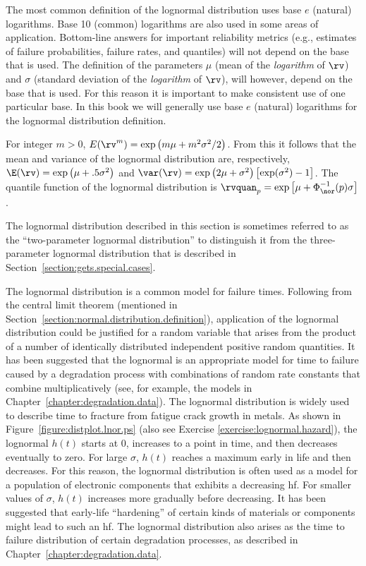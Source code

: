 The most common definition of the lognormal distribution uses base $e$
(natural) logarithms. Base 10 (common) logarithms are also used in
some areas of application. Bottom-line answers for important
reliability metrics (e.g., estimates of failure probabilities, failure
rates, and quantiles) will not depend on the base that is used.  The
definition of the parameters $\mu$ (mean of the {\em logarithm} of
$\rv$) and $\sigma$ (standard deviation of the {\em logarithm} of
$\rv$), will however, depend on the base that is used. For this reason
it is important to make consistent use of one particular base. In this
book we will generally use base $e$ (natural) logarithms for the
lognormal distribution definition.

For integer $m > 0$, $E(\rv^{m})=\exp \left (m \mu + m^{2}
\sigma^{2}/2 \right )$.  From this it follows that the mean and
variance of the lognormal distribution are, respectively, $\E(\rv)=
\exp \left (\mu+.5 \sigma^{2} \right )$ and $\var(\rv)= \exp \left
(2\mu + \sigma^{2}
\right) \left [\exp(\sigma^{2})-1 \right]$.
The quantile function of the lognormal distribution is
$\rvquan_{p}=\exp \left [\mu + \Phi^{-1}_{\nor}(p)\sigma \right ]$.

The lognormal distribution
described in this section is sometimes referred to as the
``two-parameter lognormal distribution'' to distinguish it from the
three-parameter lognormal distribution that is described in
Section~\ref{section:gets.special.cases}. 

The lognormal distribution is a common model for failure times.
Following from the central limit theorem (mentioned in
Section~\ref{section:normal.distribution.definition}), application of
the lognormal distribution could be justified for a random variable
that arises from the product of a number of identically distributed
independent positive random quantities.  It has been suggested that
the lognormal is an appropriate model for time to failure caused by a
degradation process with combinations of random rate constants that
combine multiplicatively (see, for example, the models in
Chapter~\ref{chapter:degradation.data}). The lognormal distribution is
widely used to describe time to fracture from fatigue crack growth in
metals. As shown in Figure~\ref{figure:distplot.lnor.ps} (also see
Exercise
\ref{exercise:lognormal.hazard}), the lognormal $h(t)$ starts at
0, increases to a point in time, and then decreases eventually to
zero. For large $\sigma$, $h(t)$ reaches a maximum early in life and
then decreases. For this reason, the lognormal distribution is often
used as a model for a population of electronic components that
exhibits a decreasing hf.  For smaller values of $\sigma$, $h(t)$
increases more gradually before decreasing. It has been suggested that
early-life ``hardening'' of certain kinds of materials or components
might lead to such an hf. The lognormal distribution also arises as the
time to failure distribution of certain degradation processes, as
described in Chapter~\ref{chapter:degradation.data}.


